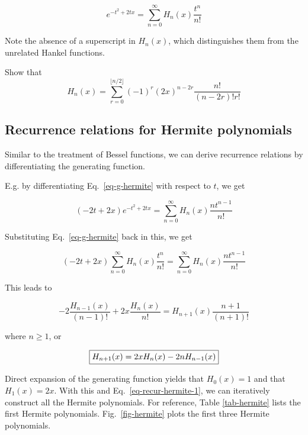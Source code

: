 \begin{equation}
e^{-t^2 + 2tx}= \sum_{n = 0}^{\infty} H_n(x)\frac{t^n}{n!} \label{eq-g-hermite}
\end{equation} 

Note the absence of a superscript in $H_n(x)$, which distinguishes them from the unrelated Hankel functions.

\begin{sidebar}
\begin{ex}
Show that
$$H_n(x) = \sum_{r=0}^{\lfloor n/2 \rfloor}(-1)^r {(2x)}^{n-2r} \frac{n!}{(n-2r)! r!}$$
\end{ex}
\end{sidebar}

\subsection{Recurrence relations for Hermite polynomials}

Similar to the treatment of Bessel functions, we can derive recurrence relations by differentiating the generating function.

E.g. by differentiating Eq.~\ref{eq-g-hermite} with respect to $t$, we get

\begin{equation}
(-2t+2x)e^{-t^2 + 2tx} = \sum_{n = 0}^{\infty} H_n(x) \frac{nt^{n-1}}{n!}
\end{equation} 

Substituting Eq.~\ref{eq-g-hermite} back in this, we get

\begin{equation}
(-2t+2x) \sum_{n = 0}^{\infty} H_n(x)\frac{t^n}{n!} = \sum_{n = 0}^{\infty} H_n(x) \frac{nt^{n-1}}{n!}
\end{equation} 

This leads to

\begin{equation}
-2  \frac{H_{n-1}(x)}{(n-1)!} + 2 x \frac{H_n(x)}{n!} = H_{n+1}(x) \frac{n+1}{(n+1)!}
\end{equation} 

where $n \geq 1$, or

\begin{equation}
\fbox{$\displaystyle
H_{n+1}(x) = 2 x H_n(x) - 2 n H_{n-1}(x)
$} \label{eq-recur-hermite-1}
\end{equation} 

Direct expansion of the generating function yields that $H_0(x) = 1$ and that $H_1(x) = 2x$. With this and Eq.~\ref{eq-recur-hermite-1}, we can iteratively construct all the Hermite polynomials. For reference, Table \ref{tab-hermite} lists the first Hermite polynomials. Fig.~\ref{fig-hermite} plots the first three Hermite polynomials.

